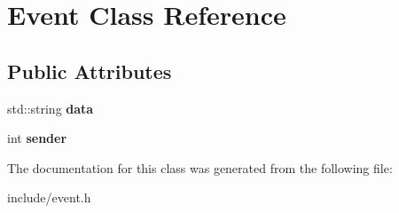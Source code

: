 \hypertarget{class_event}{}\section{Event Class Reference}
\label{class_event}
\subsection*{Public Attributes}
\begin{DoxyCompactItemize}
\item 
std\+::string {\bfseries data}\hypertarget{class_event_a666000237dce355a62f2deb159c6934c}{}\label{class_event_a666000237dce355a62f2deb159c6934c}

\item 
int {\bfseries sender}\hypertarget{class_event_a12717c4eb43a45b105bb1fae39277501}{}\label{class_event_a12717c4eb43a45b105bb1fae39277501}

\end{DoxyCompactItemize}


The documentation for this class was generated from the following file\+:\begin{DoxyCompactItemize}
\item 
include/event.\+h\end{DoxyCompactItemize}
